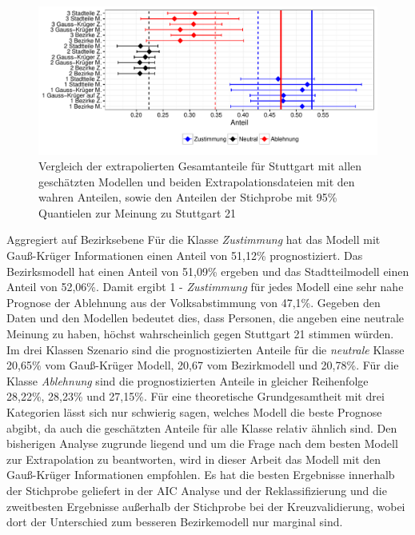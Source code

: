 \documentclass{Vorlage}
\begin{document}
\begin{figure}[h]
 \begin{center}
 \includegraphics[scale=0.8]{Pictures/S21AlleModelle}
 \caption{Vergleich der extrapolierten Gesamtanteile für Stuttgart mit allen geschätzten Modellen und beiden Extrapolationsdateien mit den wahren Anteilen, sowie den Anteilen der Stichprobe mit 95\% Quantielen zur Meinung zu Stuttgart 21}
 \label{S21Alle}
 \end{center}
\end{figure}

Aggregiert auf Bezirksebene Für die Klasse \textit{Zustimmung} hat das Modell mit Gauß-Krüger Informationen einen Anteil von 51,12\% prognostiziert. Das Bezirksmodell hat einen Anteil von 51,09\% ergeben und das Stadtteilmodell einen Anteil von 52,06\%. Damit ergibt 1 - \textit{Zustimmung} für jedes Modell eine sehr nahe Prognose der Ablehnung aus der Volksabstimmung von 47,1\%. Gegeben den Daten und den Modellen bedeutet dies, dass Personen, die angeben eine neutrale Meinung zu haben, höchst wahrscheinlich gegen Stuttgart 21 stimmen würden. Im drei Klassen Szenario sind die prognostizierten Anteile für die \textit{neutrale} Klasse 20,65\% vom Gauß-Krüger Modell, 20,67 vom Bezirkmodell und 20,78\%. Für die Klasse \textit{Ablehnung} sind die prognostizierten Anteile in gleicher Reihenfolge 28,22\%, 28,23\% und 27,15\%. Für eine theoretische Grundgesamtheit mit drei Kategorien lässt sich nur schwierig sagen, welches Modell die beste Prognose abgibt, da auch die geschätzten Anteile für alle Klasse relativ ähnlich sind. Den bisherigen Analyse zugrunde liegend und um die Frage nach dem besten Modell zur Extrapolation zu beantworten, wird in dieser Arbeit das Modell mit den Gauß-Krüger Informationen empfohlen. Es hat die besten Ergebnisse innerhalb der Stichprobe geliefert in der AIC Analyse  und der Reklassifizierung und die zweitbesten Ergebnisse außerhalb der Stichprobe bei der Kreuzvalidierung, wobei dort der Unterschied zum besseren Bezirkemodell nur marginal sind.
\end{document}
